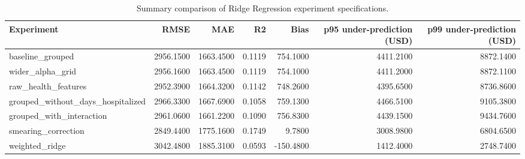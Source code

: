 \begin{table}
\caption{Summary comparison of Ridge Regression experiment specifications.}
\label{tab:04-ridge-main-results}
\begin{tabular}{lrrrrrr}
\toprule
Experiment & RMSE & MAE & R2 & Bias & p95 under-prediction (USD) & p99 under-prediction (USD) \\
\midrule
baseline_grouped & 2956.1500 & 1663.4500 & 0.1119 & 754.1000 & 4411.2100 & 8872.1400 \\
wider_alpha_grid & 2956.1600 & 1663.4500 & 0.1119 & 754.1000 & 4411.2000 & 8872.1100 \\
raw_health_features & 2952.3900 & 1664.3200 & 0.1142 & 748.2600 & 4395.6500 & 8736.8600 \\
grouped_without_days_hospitalized & 2966.3300 & 1667.6900 & 0.1058 & 759.1300 & 4466.5100 & 9105.3800 \\
grouped_with_interaction & 2961.0600 & 1661.2200 & 0.1090 & 756.8300 & 4439.1500 & 9434.7600 \\
smearing_correction & 2849.4400 & 1775.1600 & 0.1749 & 9.7800 & 3008.9800 & 6804.6500 \\
weighted_ridge & 3042.4800 & 1885.3100 & 0.0593 & -150.4800 & 1412.4000 & 2748.7400 \\
\bottomrule
\end{tabular}
\end{table}
